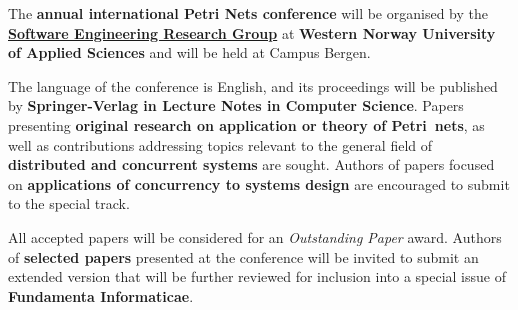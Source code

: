 \documentclass[10pt]{article}
\begin{document}
\noindent
The {\bf{} annual international Petri Nets conference} will be organised by the {\bf \href{https://www.hvl.no/en/research/group/software-engineering/}{Software Engineering Research Group}} at {\bf Western Norway University of Applied Sciences} and will be held at Campus Bergen.

%
\smallskip
\noindent
The language of the conference is English, and its proceedings will be published by
{\bf Springer-Verlag in Lecture Notes in Computer Science}.
Papers presenting {\bf original research on application or theory of Petri nets}, as well
as contributions addressing topics relevant to the general field of {\bf distributed and
concurrent systems} are sought. Authors of papers focused on {\bf applications of concurrency
to systems
design} are encouraged to submit to the special track.

\smallskip
\noindent
All accepted papers will be considered for an \textit{Outstanding
Paper} award. Authors of {\bf selected papers} presented at the conference will be invited
to submit an extended version that will be further reviewed for inclusion into a special
issue of {\bf Fundamenta Informaticae}.
\end{document}
